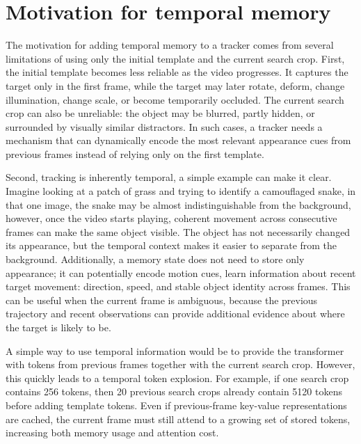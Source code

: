 \documentclass[bachelorthesis]{fer}
\numberwithin{equation}{chapter}
\begin{document}
    \section{Motivation for temporal memory}\label{motivation-for-temporal-memory}

    The motivation for adding temporal memory to a tracker comes from several limitations
    of using only the initial template and the current search crop. First, the initial
    template becomes less reliable as the video progresses. It captures the target only in
    the first frame, while the target may later rotate, deform, change illumination, change
    scale, or become temporarily occluded. The current search crop can also be unreliable:
    the object may be blurred, partly hidden, or surrounded by visually similar distractors.
    In such cases, a tracker needs a mechanism that can dynamically encode the most relevant
    appearance cues from previous frames instead of relying only on the first template.

    Second, tracking is inherently temporal, a simple example can make it clear.
    Imagine looking at a patch of grass and trying to identify a camouflaged snake,
    in that one image, the snake may be almost indistinguishable from the background,
    however, once the video starts playing, coherent movement across consecutive frames can
    make the same object visible. The object has not necessarily changed its appearance, but
    the temporal context makes it easier to separate from the background. Additionally, a memory state does not need
    to store only appearance; it can potentially
    encode motion cues, learn information about recent target movement:
    direction, speed, and stable object identity across frames. This can be useful when the
    current frame is ambiguous, because the previous trajectory and recent observations can
    provide additional evidence about where the target is likely to be.

    A simple way to use temporal information would be to provide the transformer with tokens
    from previous frames together with the current search crop. However, this quickly leads
    to a temporal token explosion. For example, if one search crop contains 256 tokens, then 20 previous search crops
    already contain 5120 tokens before adding template tokens. Even
    if previous-frame key-value representations are cached, the
    current frame must still attend to a growing set of stored tokens, increasing both memory
    usage and attention cost.
\end{document}

